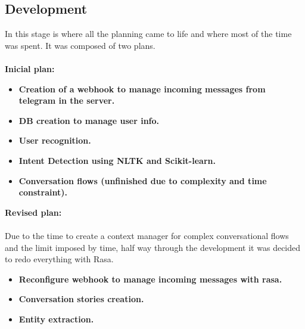 \subsection{Development}\label{sec:chap1_dev}
In this stage is where all the planning came to life and where most of the time was spent. It was composed of two plans. \\\\
\textbf{Inicial plan:}
\begin{itemize}
	\item{\textbf{Creation of a webhook to manage incoming messages from telegram in the server.}}
	\item{\textbf{DB creation to manage user info.}}
	\item{\textbf{User recognition.}}
	\item{\textbf{Intent Detection using NLTK and Scikit-learn.}}
	\item{\textbf{Conversation flows (unfinished due to complexity and time constraint).}}
\end{itemize}
\textbf{Revised plan:} \\\\
	Due to the time to create a context manager for complex conversational flows and the limit imposed by time, half way through the development it was decided to redo everything with Rasa.
\begin{itemize}
	\item{\textbf{Reconfigure webhook to manage incoming messages with rasa.}}
	\item{\textbf{Conversation stories creation.}}
	\item{\textbf{Entity extraction.}}
\end{itemize}

